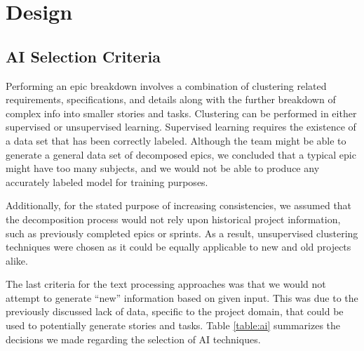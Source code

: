\section{Design}
\label{design}

\subsection{AI Selection Criteria}
\label{subsection:criteria}
Performing an epic breakdown involves a combination of clustering related requirements, specifications, and details along with the further breakdown of complex info into smaller stories and tasks. Clustering can be performed in either supervised or unsupervised learning. Supervised learning requires the existence of a data set that has been correctly labeled. Although the team might be able to generate a general data set of decomposed epics, we concluded that a typical epic might have too many subjects, and we would not be able to produce any accurately labeled model for training purposes. 

Additionally, for the stated purpose of increasing consistencies, we assumed that the decomposition process would not rely upon historical project information, such as previously completed epics or sprints. As a result, unsupervised clustering techniques were chosen as it could be equally applicable to new and old projects alike.

The last criteria for the text processing approaches was that we would not attempt to generate ``new'' information based on given input. This was due to the previously discussed lack of data, specific to the project domain, that could be used to potentially generate stories and tasks. Table \ref{table:ai} summarizes the decisions we made regarding the selection of AI techniques.

